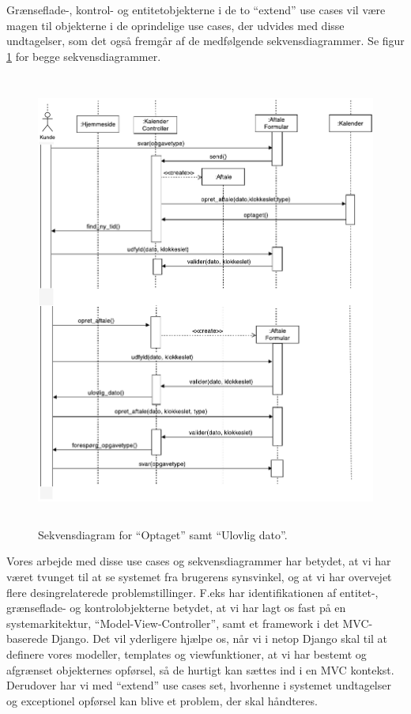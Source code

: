 \documentclass[12pt]{article}   %
\begin{document}
Grænseflade-, kontrol- og entitetobjekterne i de to ``extend'' use cases vil
være magen til objekterne i de oprindelige use cases, der udvides med disse
undtagelser, som det også fremgår af de medfølgende sekvensdiagrammer. Se figur
\ref{fig:extseq} for begge sekvensdiagrammer. \\

\begin{figure}[!ht]
	\begin{center}
\includegraphics[width=13cm, height=15cm]{ext.pdf}
\caption{Sekvensdiagram for ``Optaget'' samt  ``Ulovlig dato''.}
\label{fig:extseq}
\end{center}
\end{figure}

Vores arbejde med disse use cases og sekvensdiagrammer har betydet, at vi har
været tvunget til at se systemet fra brugerens synsvinkel, og at vi har
overvejet flere desingrelaterede problemstillinger. F.eks har identifikationen 
af entitet-, grænseflade- og kontrolobjekterne betydet, at vi har lagt os fast
på en systemarkitektur, ``Model-View-Controller'', samt et framework i det
MVC-baserede Django. Det vil yderligere hjælpe os, når vi i netop Django skal
til at definere vores modeller, templates og viewfunktioner, at vi har bestemt
og afgrænset objekternes opførsel, så de hurtigt kan sættes ind i en MVC
kontekst. Derudover har vi med ``extend'' use cases set, hvorhenne i systemet
undtagelser og exceptionel opførsel kan blive et problem, der skal håndteres. 
\end{document}
